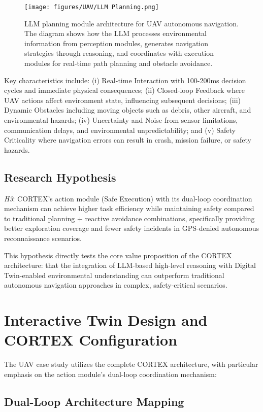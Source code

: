 \begin{figure}[htbp]
\centering
\texttt{[image: figures/UAV/LLM Planning.png]}
\caption{LLM planning module architecture for UAV autonomous navigation. The diagram shows how the LLM processes environmental information from perception modules, generates navigation strategies through reasoning, and coordinates with execution modules for real-time path planning and obstacle avoidance.}
\label{fig:llm_planning}
\end{figure}

Key characteristics include: (i) Real-time Interaction with 100-200ms decision cycles and immediate physical consequences; (ii) Closed-loop Feedback where UAV actions affect environment state, influencing subsequent decisions; (iii) Dynamic Obstacles including moving objects such as debris, other aircraft, and environmental hazards; (iv) Uncertainty and Noise from sensor limitations, communication delays, and environmental unpredictability; and (v) Safety Criticality where navigation errors can result in crash, mission failure, or safety hazards.

\subsection{Research Hypothesis}

\emph{H3}: CORTEX's action module (Safe Execution) with its dual-loop coordination mechanism can achieve higher task efficiency while maintaining safety compared to traditional planning + reactive avoidance combinations, specifically providing better exploration coverage and fewer safety incidents in GPS-denied autonomous reconnaissance scenarios.

This hypothesis directly tests the core value proposition of the CORTEX architecture: that the integration of LLM-based high-level reasoning with Digital Twin-enabled environmental understanding can outperform traditional autonomous navigation approaches in complex, safety-critical scenarios.

\section{Interactive Twin Design and CORTEX Configuration}

The UAV case study utilizes the complete CORTEX architecture, with particular emphasis on the action module's dual-loop coordination mechanism:

\subsection{Dual-Loop Architecture Mapping}

